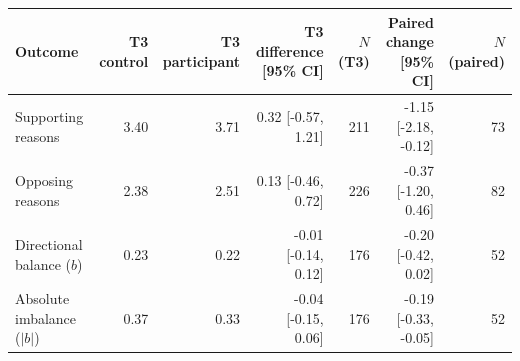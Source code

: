 
\begin{tabular}{lrrrrrr}
\toprule
Outcome & T3 control & T3 participant & T3 difference [95\% CI] & $N$ (T3) & Paired change [95\% CI] & $N$ (paired)\\
\midrule
Supporting reasons & 3.40 & 3.71 & 0.32 [-0.57, 1.21] & 211 & -1.15 [-2.18, -0.12] & 73\\
Opposing reasons & 2.38 & 2.51 & 0.13 [-0.46, 0.72] & 226 & -0.37 [-1.20, 0.46] & 82\\
Directional balance ($b$) & 0.23 & 0.22 & -0.01 [-0.14, 0.12] & 176 & -0.20 [-0.42, 0.02] & 52\\
Absolute imbalance ($|b|$) & 0.37 & 0.33 & -0.04 [-0.15, 0.06] & 176 & -0.19 [-0.33, -0.05] & 52\\
\bottomrule
\end{tabular}
